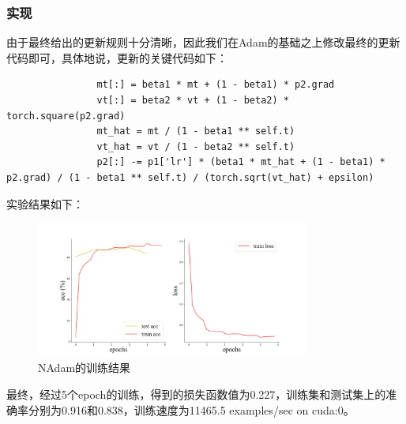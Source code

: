 \documentclass[10.5pt,a4paper]{article}%
\begin{document}
            \subsubsection{实现}
            由于最终给出的更新规则十分清晰，因此我们在Adam的基础之上修改最终的更新代码即可，具体地说，更新的关键代码如下：
            \begin{lstlisting}
                mt[:] = beta1 * mt + (1 - beta1) * p2.grad
                vt[:] = beta2 * vt + (1 - beta2) * torch.square(p2.grad)
                mt_hat = mt / (1 - beta1 ** self.t)
                vt_hat = vt / (1 - beta2 ** self.t)
                p2[:] -= p1['lr'] * (beta1 * mt_hat + (1 - beta1) * p2.grad) / (1 - beta1 ** self.t) / (torch.sqrt(vt_hat) + epsilon)
            \end{lstlisting}\par
            实验结果如下：
            \begin{figure}[H]
                \centering
                \includegraphics[width=0.8\textwidth]{imgs_5e/NAdam.png}
                  \caption{NAdam的训练结果}
                  \label{fig:nadam}
            \end{figure}  
             最终，经过5个epoch的训练，得到的损失函数值为0.227，训练集和测试集上的准确率分别为0.916和0.838，训练速度为11465.5 examples/sec on cuda:0。\par
\newpage


\newpage
\end{document}
